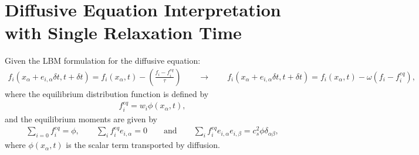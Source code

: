 \documentclass[letterpaper,10pt,english,openany,oneside]{jupyterBook}
\begin{document}
\section{Diffusive Equation Interpretation with Single Relaxation Time}
\label{\detokenize{Refs/LBM-Study/FDM-Belloti/FDM-LBM-Diffusive:diffusive-equation-interpretation-with-single-relaxation-time}}
\sphinxAtStartPar
Given the LBM formulation for the diffusive equation:
\begin{equation}\label{equation:Refs/LBM-Study/FDM-Belloti/FDM-LBM-Diffusive:LB-fdm-df-Eq}
\begin{split}
f_i( x_{\alpha} + e_{i,\alpha} \delta t, t+\delta t) = f_i(x_{\alpha}, t)  -\left( \frac{ f_{i} - f_{i}^{eq} }{ \tau } \right) \qquad \rightarrow \qquad f_i( x_{\alpha} + e_{i,\alpha} \delta t, t+\delta t) = f_i(x_{\alpha}, t)  - \omega\left( f_{i} - f_{i}^{eq} \right), 
\end{split}
\end{equation}
\sphinxAtStartPar
where the equilibrium distribution function is defined by
\begin{equation}\label{equation:Refs/LBM-Study/FDM-Belloti/FDM-LBM-Diffusive:df-fdm-feq-Eq}
\begin{split}
f^{eq}_{i} = w_{i}\phi(x_{\alpha}, t),
\end{split}
\end{equation}
\sphinxAtStartPar
and the equilibrium moments are given by
\begin{equation}\label{equation:Refs/LBM-Study/FDM-Belloti/FDM-LBM-Diffusive:moments-fdm-fi-df}
\begin{split}
\displaystyle\sum_{i=0} f_{i}^{eq}=\phi, \quad \quad  \displaystyle\sum_{i}f_{i}^{eq} e_{i,\alpha} =0 \quad \quad \textrm{and} \quad \quad  \displaystyle\sum_{i}f_{i}^{eq} e_{i,\alpha} e_{i,\beta} =c_{s}^{2} \phi \delta_{\alpha\beta},
\end{split}
\end{equation}
\sphinxAtStartPar
where \(\phi(x_{\alpha}, t)\) is the scalar term transported by diffusion.
\end{document}
